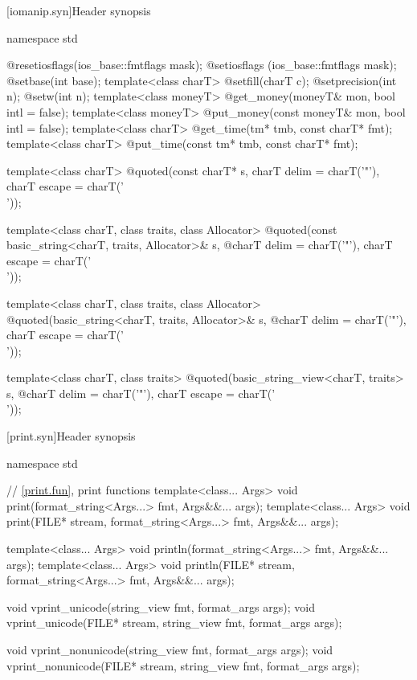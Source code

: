 %
%
%
%

[iomanip.syn]{Header  synopsis}

%
\begin{codeblock}
namespace std {
  @\unspec@ resetiosflags(ios_base::fmtflags mask);
  @\unspec@ setiosflags  (ios_base::fmtflags mask);
  @\unspec@ setbase(int base);
  template<class charT> @\unspec@ setfill(charT c);
  @\unspec@ setprecision(int n);
  @\unspec@ setw(int n);
  template<class moneyT> @\unspec@ get_money(moneyT& mon, bool intl = false);
  template<class moneyT> @\unspec@ put_money(const moneyT& mon, bool intl = false);
  template<class charT> @\unspec@ get_time(tm* tmb, const charT* fmt);
  template<class charT> @\unspec@ put_time(const tm* tmb, const charT* fmt);

  template<class charT>
    @\unspec@ quoted(const charT* s, charT delim = charT('"'), charT escape = charT('\\'));

  template<class charT, class traits, class Allocator>
    @\unspec@ quoted(const basic_string<charT, traits, Allocator>& s,
    @\itcorr@                   charT delim = charT('"'), charT escape = charT('\\'));

  template<class charT, class traits, class Allocator>
    @\unspec@ quoted(basic_string<charT, traits, Allocator>& s,
    @\itcorr@                   charT delim = charT('"'), charT escape = charT('\\'));

  template<class charT, class traits>
    @\unspec@ quoted(basic_string_view<charT, traits> s,
    @\itcorr@                   charT delim = charT('"'), charT escape = charT('\\'));
}
\end{codeblock}

[print.syn]{Header  synopsis}

%
\begin{codeblock}
namespace std {
  // \ref{print.fun}, print functions
  template<class... Args>
    void print(format_string<Args...> fmt, Args&&... args);
  template<class... Args>
    void print(FILE* stream, format_string<Args...> fmt, Args&&... args);

  template<class... Args>
    void println(format_string<Args...> fmt, Args&&... args);
  template<class... Args>
    void println(FILE* stream, format_string<Args...> fmt, Args&&... args);

  void vprint_unicode(string_view fmt, format_args args);
  void vprint_unicode(FILE* stream, string_view fmt, format_args args);

  void vprint_nonunicode(string_view fmt, format_args args);
  void vprint_nonunicode(FILE* stream, string_view fmt, format_args args);
}
\end{codeblock}


